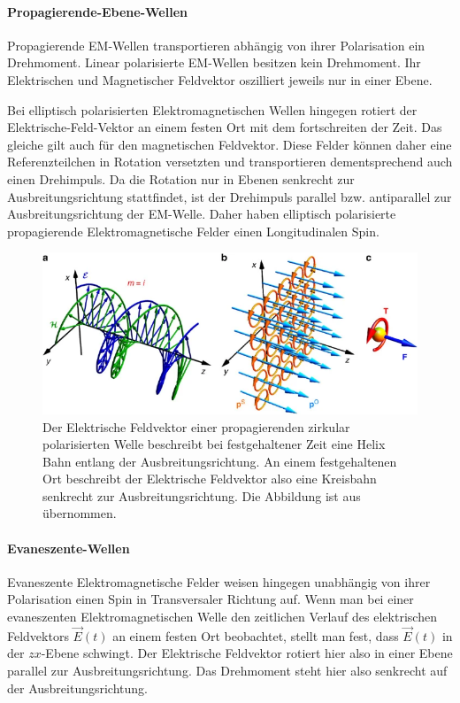\documentclass[titlepage]{article}
\begin{document}
	\paragraph{Propagierende-Ebene-Wellen}
		Propagierende EM-Wellen transportieren abhängig von ihrer Polarisation ein Drehmoment. Linear polarisierte EM-Wellen besitzen kein Drehmoment. Ihr Elektrischen und Magnetischer Feldvektor oszilliert jeweils nur in einer Ebene.
		 
		Bei elliptisch polarisierten Elektromagnetischen Wellen hingegen rotiert der Elektrische-Feld-Vektor an einem festen Ort mit dem fortschreiten der Zeit. Das gleiche gilt auch für den magnetischen Feldvektor. Diese Felder können daher eine Referenzteilchen in Rotation versetzten und transportieren dementsprechend auch einen Drehimpuls. Da die Rotation nur in Ebenen senkrecht zur Ausbreitungsrichtung stattfindet, ist der Drehimpuls parallel bzw. antiparallel zur Ausbreitungsrichtung der EM-Welle. Daher haben elliptisch polarisierte propagierende Elektromagnetische Felder einen Longitudinalen Spin.
		
		\begin{figure}[h]
			\centering
			\includegraphics[width=0.7\linewidth]{figures/spin/prop_spin}
			\caption{Der Elektrische Feldvektor einer propagierenden zirkular polarisierten Welle beschreibt bei festgehaltener Zeit eine Helix Bahn entlang der Ausbreitungsrichtung. An einem festgehaltenen Ort beschreibt der Elektrische Feldvektor also eine Kreisbahn senkrecht zur Ausbreitungsrichtung. Die Abbildung ist aus \cite{Bliokh.2014} übernommen.}
			\label{fig:prop_spin}
		\end{figure}
		
	\paragraph{Evaneszente-Wellen}	
	Evaneszente Elektromagnetische Felder weisen hingegen unabhängig von ihrer Polarisation einen Spin in Transversaler Richtung auf. Wenn man bei einer evaneszenten Elektromagnetischen Welle den zeitlichen Verlauf des elektrischen Feldvektors $\vec{E}(t)$ an einem festen Ort beobachtet, stellt man fest, dass $\vec{E}(t)$ in der $zx$-Ebene schwingt. Der Elektrische Feldvektor rotiert hier also in einer Ebene parallel zur Ausbreitungsrichtung. Das Drehmoment steht hier also senkrecht auf der Ausbreitungsrichtung. \cite{Bliokh.2014}
	
\end{document}
